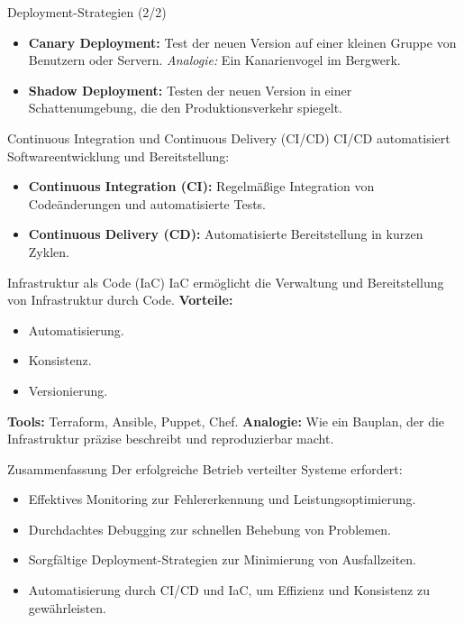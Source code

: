 \documentclass{beamer}
\begin{document}
\begin{frame}{Deployment-Strategien (2/2)}
    \begin{itemize}
        \item \textbf{Canary Deployment:} Test der neuen Version auf einer kleinen Gruppe von Benutzern oder Servern. \newline \textit{Analogie:} Ein Kanarienvogel im Bergwerk.
        \item \textbf{Shadow Deployment:} Testen der neuen Version in einer Schattenumgebung, die den Produktionsverkehr spiegelt.
    \end{itemize}
\end{frame}

\begin{frame}{Continuous Integration und Continuous Delivery (CI/CD)}
    CI/CD automatisiert Softwareentwicklung und Bereitstellung:
    \begin{itemize}
        \item \textbf{Continuous Integration (CI):} Regelmäßige Integration von Codeänderungen und automatisierte Tests.
        \item \textbf{Continuous Delivery (CD):} Automatisierte Bereitstellung in kurzen Zyklen.
    \end{itemize}
\end{frame}

\begin{frame}{Infrastruktur als Code (IaC)}
    IaC ermöglicht die Verwaltung und Bereitstellung von Infrastruktur durch Code. \newline
    \textbf{Vorteile:}
    \begin{itemize}
        \item Automatisierung.
        \item Konsistenz.
        \item Versionierung.
    \end{itemize}
    \textbf{Tools:} Terraform, Ansible, Puppet, Chef. \newline
    \textbf{Analogie:} Wie ein Bauplan, der die Infrastruktur präzise beschreibt und reproduzierbar macht.
\end{frame}

\begin{frame}{Zusammenfassung}
    Der erfolgreiche Betrieb verteilter Systeme erfordert:
    \begin{itemize}
        \item Effektives Monitoring zur Fehlererkennung und Leistungsoptimierung.
        \item Durchdachtes Debugging zur schnellen Behebung von Problemen.
        \item Sorgfältige Deployment-Strategien zur Minimierung von Ausfallzeiten.
        \item Automatisierung durch CI/CD und IaC, um Effizienz und Konsistenz zu gewährleisten.
    \end{itemize}
\end{frame}
\end{document}
